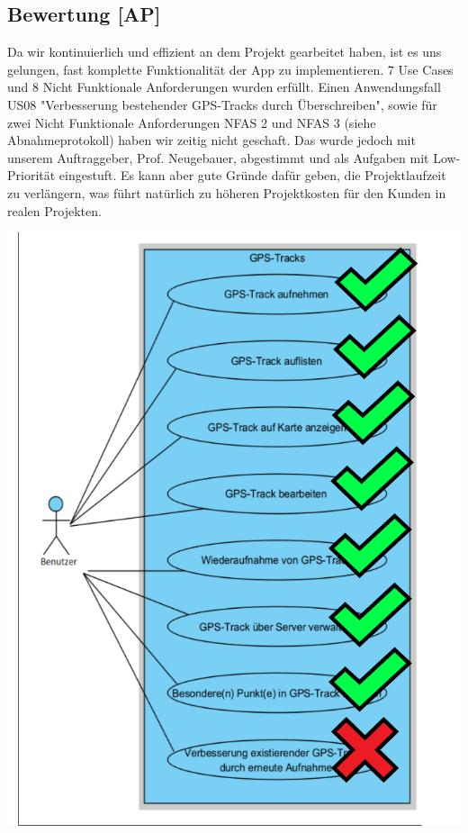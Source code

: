 \documentclass[10pt]{article}
\begin{document}
\subsection{Bewertung [AP]}
    Da wir kontinuierlich und effizient an dem Projekt gearbeitet haben, ist es uns gelungen, fast komplette Funktionalität der App zu implementieren.
    7 Use Cases und 8 Nicht Funktionale Anforderungen wurden erfüllt. Einen Anwendungsfall US08 "Verbesserung bestehender GPS-Tracks durch Überschreiben", sowie für  
    zwei Nicht Funktionale Anforderungen NFAS 2 und NFAS 3 (siehe Abnahmeprotokoll) haben wir zeitig nicht geschaft. Das wurde jedoch mit unserem Auftraggeber, Prof. Neugebauer, 
    abgestimmt und als Aufgaben mit Low-Priorität eingestuft.
    Es kann aber gute Gründe dafür geben, die Projektlaufzeit zu verlängern, was führt natürlich zu höheren Projektkosten für den Kunden in realen Projekten.
    \begin{center}
        \includegraphics[scale=0.4]{use_case_comleted.png}
    \end{center}
\end{document}
